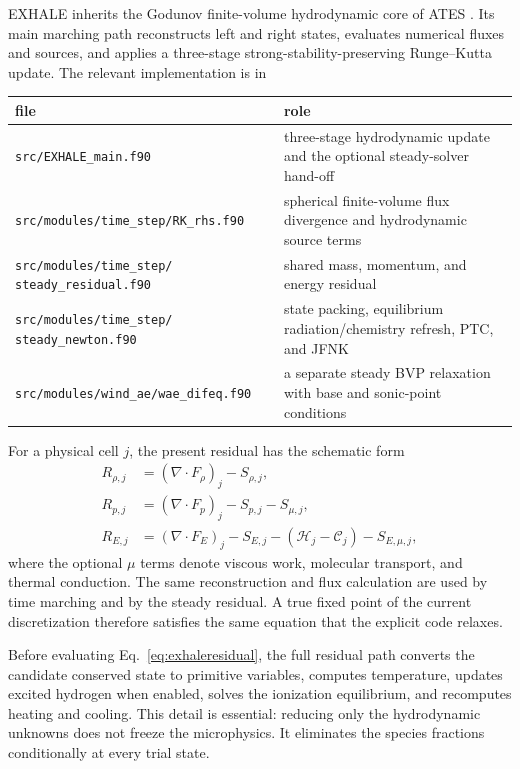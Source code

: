 \documentclass[english,a4paper]{my_memo}
\newcommand{\code}[1]{\texttt{#1}}
\begin{document}
EXHALE inherits the Godunov finite-volume hydrodynamic core of ATES
\cite{Caldiroli2021}.  Its main marching path reconstructs left and right
states, evaluates numerical fluxes and sources, and applies a three-stage
strong-stability-preserving Runge--Kutta update.  The relevant implementation
is in
\begin{center}
\begin{tabular}{@{}p{}p{}@{}}
\toprule
file & role \\
\midrule
\code{src/EXHALE\_main.f90} & three-stage hydrodynamic update and the
  optional steady-solver hand-off \\
\code{src/modules/time\_step/RK\_rhs.f90} & spherical finite-volume flux
  divergence and hydrodynamic source terms \\
\code{src/modules/time\_step/}\newline
\code{steady\_residual.f90} & shared mass, momentum,
  and energy residual \\
\code{src/modules/time\_step/}\newline
\code{steady\_newton.f90} & state packing, equilibrium
  radiation/chemistry refresh, PTC, and JFNK \\
\code{src/modules/wind\_ae/wae\_difeq.f90} & a separate steady BVP relaxation
  with base and sonic-point conditions \\
\bottomrule
\end{tabular}
\end{center}

For a physical cell \(j\), the present residual has the schematic form
\begin{align}
 R_{\rho,j} &= (\nabla\!\cdot\!F_\rho)_j-S_{\rho,j},\\
 R_{p,j} &= (\nabla\!\cdot\!F_p)_j-S_{p,j}-S_{\mu,j},\\
 R_{E,j} &= (\nabla\!\cdot\!F_E)_j-S_{E,j}
             -(\mathcal{H}_j-\mathcal{C}_j)-S_{E,\mu,j},
 \label{eq:exhaleresidual}
\end{align}
where the optional \(\mu\) terms denote viscous work, molecular transport, and
thermal conduction.  The same reconstruction and flux calculation are used by
time marching and by the steady residual.  A true fixed point of the current
discretization therefore satisfies the same equation that the explicit code
relaxes.

Before evaluating Eq.~\eqref{eq:exhaleresidual}, the full residual path converts
the candidate conserved state to primitive variables, computes temperature,
updates excited hydrogen when enabled, solves the ionization equilibrium, and
recomputes heating and cooling.  This detail is essential: reducing only the
hydrodynamic unknowns does not freeze the microphysics.  It eliminates the
species fractions conditionally at every trial state.
\end{document}
